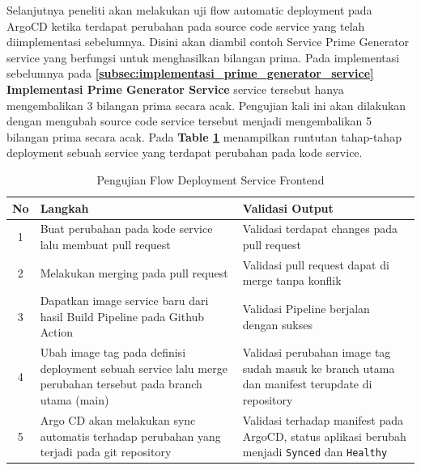 Selanjutnya peneliti akan melakukan uji flow automatic deployment pada ArgoCD
ketika terdapat perubahan pada source code service yang telah diimplementasi
sebelumnya. Disini akan diambil contoh Service Prime Generator service yang
berfungsi untuk menghasilkan bilangan prima. Pada implementasi sebelumnya pada
\textbf{\ref{subsec:implementasi_prime_generator_service} Implementasi Prime
  Generator Service} service tersebut hanya mengembalikan 3 bilangan prima secara
acak. Pengujian kali ini akan dilakukan dengan mengubah source code service
tersebut menjadi mengembalikan 5 bilangan prima secara acak. Pada \textbf{Table
  \ref{tab:pengujian-flow-deployment-frontend}} menampilkan runtutan tahap-tahap
deployment sebuah service yang terdapat perubahan pada kode service.

\begin{table}[H]
  \centering
  \small
  \begin{tabular}{|c|p{6cm}|p{8cm}|}
    \hline
    \textbf{No} & \textbf{Langkah}                                                                                              & \textbf{Validasi Output}                                                                                     \\
    \hline
    1           & Buat perubahan pada kode service lalu membuat pull request                                                    & Validasi terdapat changes pada pull request                                                                  \\
    \hline
    2           & Melakukan merging pada pull request                                                                           & Validasi pull request dapat di merge tanpa konflik                                                           \\
    \hline
    3           & Dapatkan image service baru dari hasil Build Pipeline pada Github Action                                      & Validasi Pipeline berjalan dengan sukses                                                                     \\
    \hline
    4           & Ubah image tag pada definisi deployment sebuah service lalu merge perubahan tersebut pada branch utama (main) & Validasi perubahan image tag sudah masuk ke branch utama dan manifest terupdate di repository                \\
    \hline
    5           & Argo CD akan melakukan sync automatis terhadap perubahan yang terjadi pada git repository                     & Validasi terhadap manifest pada ArgoCD, status aplikasi berubah menjadi \texttt{Synced} dan \texttt{Healthy} \\
    \hline
  \end{tabular}
  \caption{Pengujian Flow Deployment Service Frontend}
  \label{tab:pengujian-flow-deployment-frontend}
\end{table}


